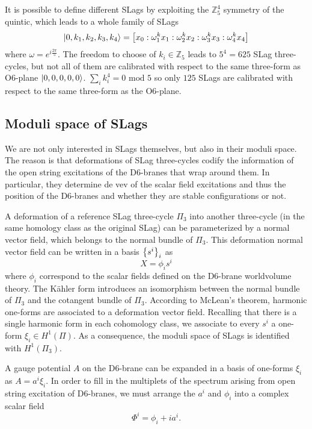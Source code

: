 It is possible to define different SLags by exploiting the $\mathbb Z_5^4$ symmetry of the quintic,
which leads to a whole family of SLags
\begin{equation}
  \ket{0,k_1,k_2,k_3,k_4} = {\qty[x_0:\omega^k_1 x_1:\omega^k_2 x_2:\omega^k_3 x_3:\omega^k_4 x_4]}
\end{equation}
where $\omega=e^{i\frac{2\pi}{5}}$. 
The freedom to choose of $k_i\in \mathbb Z_5$ leads to $5^4=625$ SLag three-cycles, but not all of them are calibrated
with respect to the same three-form as O$6$-plane $\ket{0,0,0,0,0}$.
$\sum_{i} k_i^4=0 \text{ mod 5}$
so only $125$ SLags are calibrated with respect to the same three-form as the O$6$-plane.

\subsection{Moduli space of SLags}

We are not only interested in SLags themselves, but also in their moduli space.
The reason is that deformations of SLag three-cycles codify the information of the open string 
excitations of the D$6$-branes that wrap around them.
In particular, they determine de vev of the scalar field excitations and thus the position of the D6-branes
and whether they are stable configurations or not.

A deformation of a reference SLag three-cycle $\Pi_3$ into another three-cycle (in the same homology class as the original SLag)  can be parameterized by a normal vector field, which belongs to the normal bundle of $\Pi_3$.  
This deformation normal vector field can be written in a basis $\qty{s^i}_i$ as
\begin{equation}
  X=\phi_i s^i
\end{equation}
where $\phi_i$ correspond to the scalar fields defined on the D6-brane worldvolume theory.
The Kähler form introduces an isomorphism between the normal bundle of $\Pi_3$ and the cotangent bundle of $\Pi_3$.
According to McLean's theorem, harmonic one-forms are associated to a deformation vector field.
Recalling that there is a single harmonic form in each cohomology class, we associate to every $s^i$ a one-form $\xi_i\in H^1(\Pi)$.
As a consequence, the moduli space of SLags is identified with $H^1(\Pi_3)$.

A gauge potential $A$ on the D$6$-brane can be expanded in a basis of one-forms $\xi_i$ as $A=a^i \xi_i$.
In order to fill in the multiplets of the spectrum arising from open string excitation of D6-branes,
we must arrange the $a^i$ and $\phi_i$ into a complex scalar field
\begin{equation}
 \Phi^i = \phi_i + ia^i. 
\end{equation}

